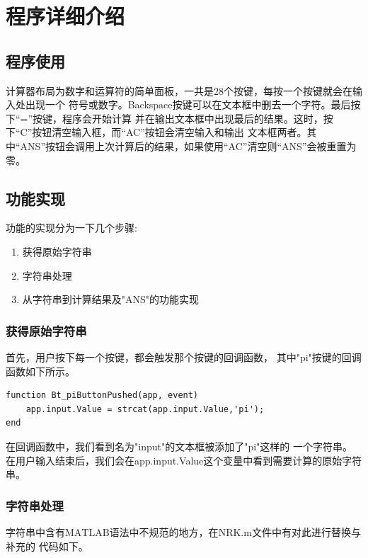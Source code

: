 \documentclass[AutoFakeBold]{LZUThesis}
\begin{document}


\chapter{程序详细介绍}

\section{程序使用}
计算器布局为数字和运算符的简单面板，一共是28个按键，每按一个按键就会在输入处出现一个
符号或数字。Backspace按键可以在文本框中删去一个字符。最后按下“=”按键，程序会开始计算
并在输出文本框中出现最后的结果。这时，按下“C”按钮清空输入框，而“AC”按钮会清空输入和输出
文本框两者。其中“ANS”按钮会调用上次计算后的结果，如果使用“AC”清空则“ANS”会被重置为零。

\section{功能实现}

功能的实现分为一下几个步骤:
\begin{enumerate}
    \item 获得原始字符串
    \item 字符串处理
    \item 从字符串到计算结果及"ANS"的功能实现
\end{enumerate}

\subsection{获得原始字符串}
首先，用户按下每一个按键，都会触发那个按键的回调函数，
其中"pi"按键的回调函数如下所示。
\begin{lstlisting}
function Bt_piButtonPushed(app, event)
    app.input.Value = strcat(app.input.Value,'pi');
end
\end{lstlisting}

在回调函数中，我们看到名为"input"的文本框被添加了"pi"这样的 一个字符串。
在用户输入结束后，我们会在app.input.Value这个变量中看到需要计算的原始字符串。

\subsection{字符串处理}

字符串中含有$\mathrm{MATLAB}$语法中不规范的地方，在$\mathrm{NRK.m}$文件中有对此进行替换与补充的
代码如下。

\newpage
\end{document}
